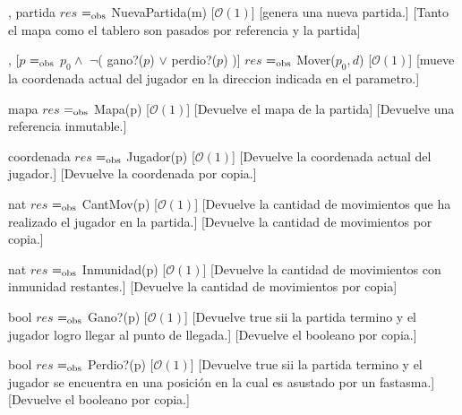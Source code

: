 \documentclass[10pt,a4paper]{article}
\begin{document}
\begin{Interfaz}
    {, }{partida}%
    {$res$ $=_{\mathrm{obs}}$ NuevaPartida(m)}%
    [$\mathcal{O}(1)$]
    [genera una nueva partida.]
    [Tanto el mapa como el tablero son pasados por referencia y la partida]
    
    {, }{}%
    [$p$ $=_{\mathrm{obs}}$ $p_0 \land$ $\neg$( gano?($p$) $\lor$ perdio?($p$) )]%
    {$res$ $=_{\mathrm{obs}}$ Mover($p_0, d$)}
    [$\mathcal{O}(1)$]
    [mueve la coordenada actual del jugador en la direccion indicada en el parametro.]
    
    {}{mapa}%
    {$res$ $=_{\mathrm{obs}}$ Mapa(p)}%
    [$\mathcal{O}(1)$]
    [Devuelve el mapa de la partida]
    [Devuelve una referencia inmutable.]
    
    {}{coordenada}%
    {$res$ $=_{\mathrm{obs}}$ Jugador(p)}
    [$\mathcal{O}(1)$]
    [Devuelve la coordenada actual del jugador.]
    [Devuelve la coordenada por copia.]
    
    {}{nat}%
    {$res$ $=_{\mathrm{obs}}$ CantMov(p)}
    [$\mathcal{O}(1)$]
    [Devuelve la cantidad de movimientos que ha realizado el jugador en la partida.]
    [Devuelve la cantidad de movimientos por copia.]
    
    {}{nat}%
    {$res$ $=_{\mathrm{obs}}$ Inmunidad(p)}
    [$\mathcal{O}(1)$]
    [Devuelve la cantidad de movimientos con inmunidad restantes.]
    [Devuelve la cantidad de movimientos por copia]
    
    {}{bool}%
    {$res$ $=_{\mathrm{obs}}$ Gano?(p)}
    [$\mathcal{O}(1)$]
    [Devuelve true sii la partida termino y el jugador logro llegar al punto de llegada.]
    [Devuelve el booleano por copia.]
    
    {}{bool}%
    {$res$ $=_{\mathrm{obs}}$ Perdio?(p)}
    [$\mathcal{O}(1)$]
    [Devuelve true sii la partida termino y el jugador se encuentra en una posición en la cual es asustado por un fastasma.]
    [Devuelve el booleano por copia.]
    
\end{Interfaz}
\end{document}
